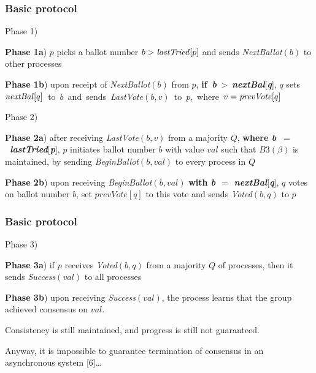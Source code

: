 \documentclass[10 pt]{beamer}
\begin{document}
\begin{frame}
\frametitle{Basic protocol}

  Phase 1)
   
  \hspace{3 mm} \textbf{Phase 1a}) $p$ picks a ballot number $b > \text{\textit{lastTried}}[p]$ and sends \textit{NextBallot}$(b)$ to other processes
   
  \hspace{3 mm} \textbf{Phase 1b}) upon receipt of \textit{NextBallot}$(b)$ from $p$, \mbox{\textbf{if \textit{b}} > \textbf{\textit{nextBal}}[\textbf{\textit{q}}],} $q$ \mbox{sets $\text{\textit{nextBal}}[q]$ to $b$ and sends \textit{LastVote}$(b, v)$ to $p$, where $v = \text{\textit{prevVote}}[q]$}
   
  \vspace{6 mm}
  
  \pause  
  Phase 2)
   
  \hspace{3 mm} \textbf{Phase 2a}) after receiving \textit{LastVote}$(b, v)$ from a majority $Q$, \textbf{where \mbox{\textit{b $=$ lastTried}}}[\textbf{\textit{p}}], $p$ initiates ballot  number $b$ with value $val$ such that $B3(\beta)$ is maintained, by sending \textit{BeginBallot}$(b, val)$ to every process in $Q$
      
  \hspace{3 mm} \textbf{Phase 2b}) upon receiving \textit{BeginBallot}$(b, val)$ \textbf{with \textit{b $=$ nextBal}}[\textbf{\textit{q}}], $q$ votes on ballot number $b$, set $prevVote[q]$ to this vote and sends \textit{Voted}$(b, q)$ to $p$
  
\end{frame}



\begin{frame}
\frametitle{Basic protocol}
   
  Phase 3)
   
  \hspace{3 mm} \textbf{Phase 3a}) if $p$ receives \textit{Voted}$(b, q)$ from a majority $Q$ of processes, then it sends \textit{Success}$(val)$ to all processes
      
  \hspace{3 mm} \textbf{Phase 3b}) upon receiving \textit{Success}$(val)$, the process learns that the group achieved consensus on $val$.

  \pause  
  \vspace{6mm}
  Consistency is still maintained, and progress is still not guaranteed.

  \vspace{6mm}
  Anyway, it is impossible to guarantee termination of consensus in an asynchronous system [6]\ldots 
 
\end{frame}
\end{document}
